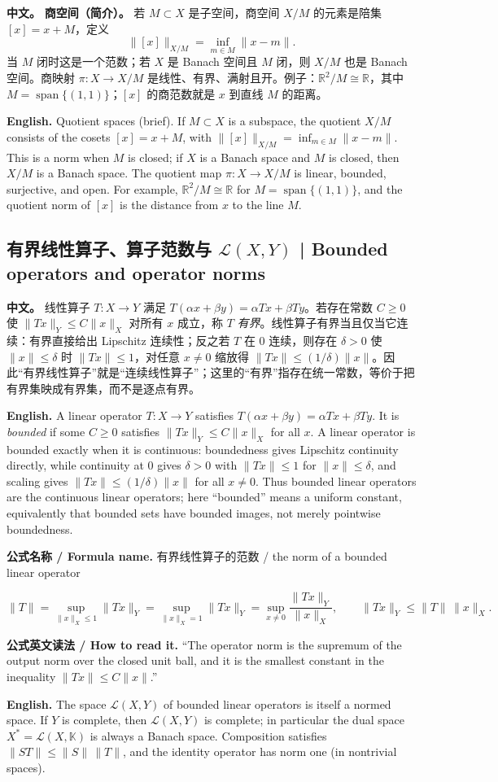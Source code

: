 \documentclass[UTF8,11pt,a4paper]{ctexart}
\newcommand{\EN}[1]{\par\noindent \textbf{English.} #1\par}
\newcommand{\READ}[1]{\par\noindent \textbf{公式英文读法 / How to read it.} #1\par}
\newcommand{\FORMULA}[2]{\par\noindent\textbf{公式名称 / Formula name.} #1 / #2\par}
\newcommand{\APS}[2]{\par\noindent\textbf{中文。} #1\par\noindent\textbf{English.} #2\par\smallskip}
\begin{document}
\APS{\textbf{商空间（简介）。} 若 $M\subset X$ 是子空间，商空间 $X/M$ 的元素是陪集 $[x]=x+M$，定义
\[
\|[x]\|_{X/M}=\inf_{m\in M}\|x-m\|.
\]
当 $M$ 闭时这是一个范数；若 $X$ 是 Banach 空间且 $M$ 闭，则 $X/M$ 也是 Banach 空间。商映射 $\pi:X\to X/M$ 是线性、有界、满射且开。例子：$\mathbb R^2/M\cong\mathbb R$，其中 $M=\operatorname{span}\{(1,1)\}$；$[x]$ 的商范数就是 $x$ 到直线 $M$ 的距离。}{Quotient spaces (brief). If $M\subset X$ is a subspace, the quotient $X/M$ consists of the cosets $[x]=x+M$, with $\|[x]\|_{X/M}=\inf_{m\in M}\|x-m\|$. This is a norm when $M$ is closed; if $X$ is a Banach space and $M$ is closed, then $X/M$ is a Banach space. The quotient map $\pi:X\to X/M$ is linear, bounded, surjective, and open. For example, $\mathbb R^2/M\cong\mathbb R$ for $M=\operatorname{span}\{(1,1)\}$, and the quotient norm of $[x]$ is the distance from $x$ to the line $M$.}

\subsection{有界线性算子、算子范数与 \texorpdfstring{$\mathcal L(X,Y)$}{L(X,Y)} | Bounded operators and operator norms}
\APS{线性算子 $T:X\to Y$ 满足 $T(\alpha x+\beta y)=\alpha Tx+\beta Ty$。若存在常数 $C\ge0$ 使 $\|Tx\|_Y\le C\|x\|_X$ 对所有 $x$ 成立，称 $T$ \emph{有界}。线性算子有界当且仅当它连续：有界直接给出 Lipschitz 连续性；反之若 $T$ 在 $0$ 连续，则存在 $\delta>0$ 使 $\|x\|\le\delta$ 时 $\|Tx\|\le1$，对任意 $x\ne0$ 缩放得 $\|Tx\|\le(1/\delta)\|x\|$。因此“有界线性算子”就是“连续线性算子”；这里的“有界”指存在统一常数，等价于把有界集映成有界集，而不是逐点有界。}{A linear operator $T:X\to Y$ satisfies $T(\alpha x+\beta y)=\alpha Tx+\beta Ty$. It is \emph{bounded} if some $C\ge0$ satisfies $\|Tx\|_Y\le C\|x\|_X$ for all $x$. A linear operator is bounded exactly when it is continuous: boundedness gives Lipschitz continuity directly, while continuity at $0$ gives $\delta>0$ with $\|Tx\|\le1$ for $\|x\|\le\delta$, and scaling gives $\|Tx\|\le(1/\delta)\|x\|$ for all $x\ne0$. Thus bounded linear operators are the continuous linear operators; here ``bounded'' means a uniform constant, equivalently that bounded sets have bounded images, not merely pointwise boundedness.}
\FORMULA{有界线性算子的范数}{the norm of a bounded linear operator}
\[
\|T\|=\sup_{\|x\|_X\le1}\|Tx\|_Y
=\sup_{\|x\|_X=1}\|Tx\|_Y
=\sup_{x\ne0}\frac{\|Tx\|_Y}{\|x\|_X},
\qquad
\|Tx\|_Y\le\|T\|\,\|x\|_X.
\]
\READ{``The operator norm is the supremum of the output norm over the closed unit ball, and it is the smallest constant in the inequality $\|Tx\|\le C\|x\|$.''}
\EN{The space $\mathcal L(X,Y)$ of bounded linear operators is itself a normed space. If $Y$ is complete, then $\mathcal L(X,Y)$ is complete; in particular the dual space $X^*=\mathcal L(X,\mathbb K)$ is always a Banach space. Composition satisfies $\|ST\|\le\|S\|\,\|T\|$, and the identity operator has norm one (in nontrivial spaces).}
\end{document}
